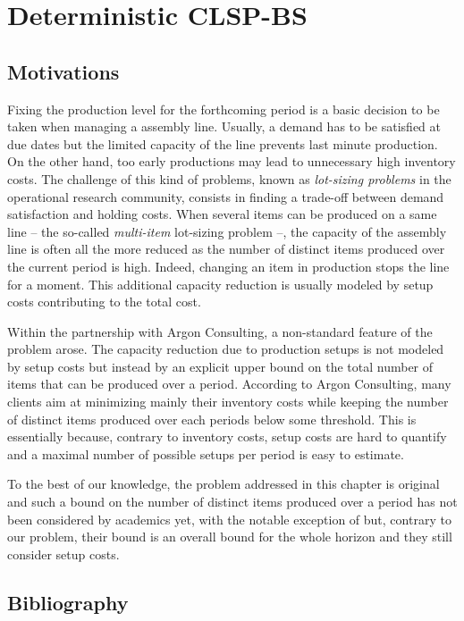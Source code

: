 \chapter{Deterministic CLSP-BS}
\label{chap:PDP - deterministic}


\section{Motivations}
\label{sec:PDP:Motivations}

Fixing the production level for the forthcoming period is a basic decision to be taken when managing a assembly line. Usually, a demand has to be satisfied at due dates but the limited capacity of the line prevents last minute production. On the other hand, too early productions may lead to unnecessary high inventory costs. The challenge of this kind of problems, known as {\em lot-sizing problems} in the operational research community, consists in finding a trade-off between demand satisfaction and holding costs.
When several items can be produced on a same line -- the so-called {\em multi-item} lot-sizing problem --, the capacity of the assembly line is often all the more reduced as the number of distinct items produced over the current period is high. Indeed, changing an item in production stops the line for a moment. This additional capacity reduction is usually modeled by setup costs contributing to the total cost.


Within the partnership with Argon Consulting, a non-standard feature of the problem arose. The capacity reduction due to production setups is not modeled by setup costs but instead by an explicit upper bound on the total number of items that can be produced over a period. According to Argon Consulting, many clients aim at minimizing mainly their inventory costs while keeping the number of distinct items produced over each periods below some threshold. This is essentially because, contrary to inventory costs, setup costs are hard to quantify and a maximal number of possible setups per period is easy to estimate.


To the best of our knowledge, the problem addressed in this chapter is original and such a bound on the number of distinct items produced over a period has not been considered by academics yet, with the notable exception of \cite{Rubaszewski2011} but, contrary to our problem, their bound is an overall bound for the whole horizon and they still consider setup costs.


\section{Bibliography}


